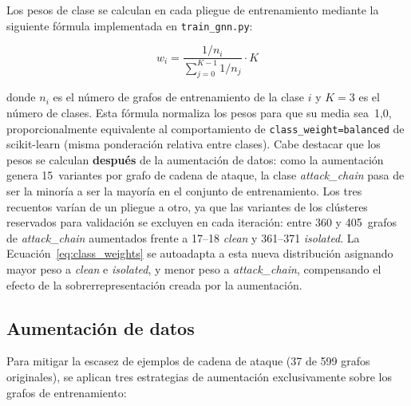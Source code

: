 Los pesos de clase se calculan en cada pliegue de entrenamiento mediante la
siguiente fórmula implementada en \texttt{train\_gnn.py}:

\begin{equation}
  w_i = \frac{1/n_i}{\displaystyle\sum_{j=0}^{K-1} 1/n_j} \cdot K
  \label{eq:class_weights}
\end{equation}

donde \(n_i\) es el número de grafos de entrenamiento de la clase \(i\) y \(K=3\)
es el número de clases. Esta fórmula normaliza los pesos para que su media sea~1,0,
proporcionalmente equivalente al comportamiento de \texttt{class\_weight=balanced} de
scikit-learn (misma ponderación relativa entre clases). Cabe destacar que los pesos se calculan
\textbf{después} de la aumentación de datos: como la aumentación genera 15~variantes
por grafo de cadena de ataque, la clase \textit{attack\_chain} pasa de ser la
minoría a ser la mayoría en el conjunto de entrenamiento. Los tres recuentos varían de
un pliegue a otro, ya que las variantes de los clústeres reservados para validación se
excluyen en cada iteración: entre 360 y 405~grafos de \textit{attack\_chain} aumentados
frente a 17--18 \textit{clean} y 361--371 \textit{isolated}. La
Ecuación~\ref{eq:class_weights} se autoadapta a esta nueva distribución
asignando mayor peso a \textit{clean} e \textit{isolated}, y menor peso a
\textit{attack\_chain}, compensando el efecto de la sobrerrepresentación creada por
la aumentación.

\subsection{Aumentación de datos}
\label{sec:aumentacion}

Para mitigar la escasez de ejemplos de cadena de ataque (37 de 599 grafos
originales), se aplican tres estrategias de aumentación exclusivamente sobre los
grafos de entrenamiento:


